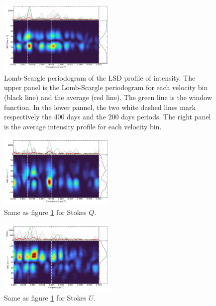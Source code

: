 \documentclass{aa}
\begin{document}
\begin{figure}[!h]
    \centering
    \includegraphics[width=0.5\textwidth]{Lomb-Scargle Intensity.pdf}
    \caption{Lomb-Scargle periodogram of the LSD profile of intensity.
    The upper panel is the Lomb-Scargle periodogram for each velocity bin (black line) and the average (red line). The green line is the window function.
    In the lower pannel, the two white dashed lines mark respectively the 400 days and the 200 days periods. The right panel is the average intensity profile for each velocity bin.}
    \label{LS intensity}
\end{figure}

\begin{figure}[!h]
    \centering
    \includegraphics[width=0.5\textwidth]{Lomb-Scargle Stokes Q.pdf}
    \caption{Same as figure \ref{LS intensity} for Stokes $Q$. }
    \label{LS Q}
\end{figure}

\begin{figure}[!h]
    \centering
    \includegraphics[width=0.5\textwidth]{Lomb-Scargle Stokes U.pdf}
    \caption{Same as figure \ref{LS intensity} for Stokes $U$.}
    \label{LS U}
\end{figure}
\end{document}
